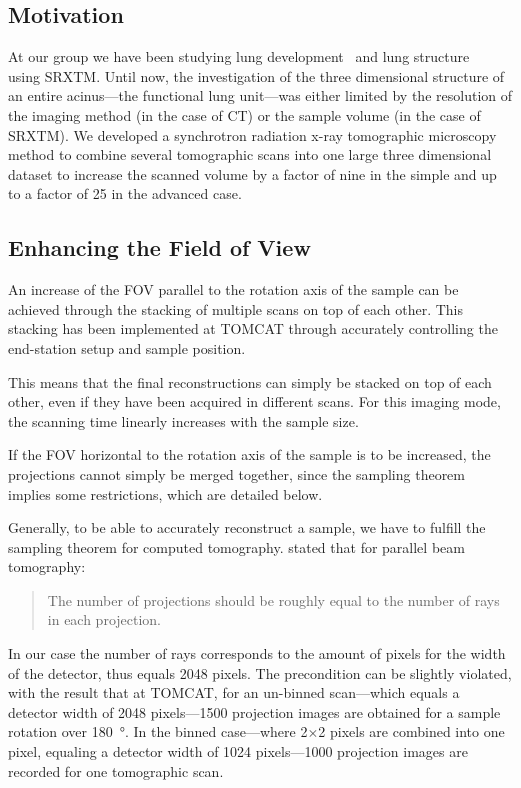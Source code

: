 \subsection{Motivation}
\label{subsec:motivation}
At our group we have been studying lung development~\cite{Schittny2008,Mund2008} and lung structure~\cite{Tsuda2008} using SRXTM. Until now, the investigation of the three dimensional structure of an entire acinus---the functional lung unit---was either limited by the resolution of the imaging method (in the case of \micro CT) or the sample volume (in the case of SRXTM). We developed a synchrotron radiation x-ray tomographic microscopy method to combine several tomographic scans into one large three dimensional dataset to increase the scanned volume by a factor of nine in the simple and up to a factor of 25 in the advanced case.

\subsection{Enhancing the Field of View}
\label{subsec:enhancing the field of view}
An increase of the FOV parallel to the rotation axis of the sample can be achieved through the stacking of multiple scans on top of each other. This stacking has been implemented at TOMCAT through accurately controlling the end-station setup and sample position.

This means that the final reconstructions can simply be stacked on top of each other, even if they have been acquired in different scans. For this imaging mode, the scanning time linearly increases with the sample size.

If the FOV horizontal to the rotation axis of the sample is to be increased, the projections cannot simply be merged together, since the sampling theorem implies some restrictions, which are detailed below.

Generally, to be able to accurately reconstruct a sample, we have to fulfill the sampling theorem for computed tomography. \citet{Kak2002} stated that for parallel beam tomography: \begin{quote} The number of projections should be roughly equal to the number of rays in each projection. \end{quote} In our case the number of rays corresponds to the amount of pixels for the width of the detector, thus equals 2048 pixels. The precondition can be slightly violated, with the result that at TOMCAT, for an un-binned scan---which equals a detector width of 2048 pixels---1500 projection images are obtained for a sample rotation over \SI{180}{\degree}. In the binned case---where 2$\times$2 pixels are combined into one pixel, equaling a detector width of 1024 pixels---1000 projection images are recorded for one tomographic scan.

